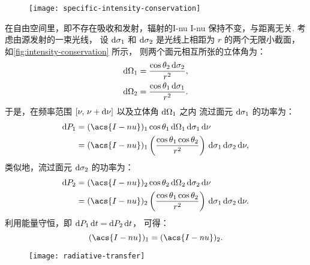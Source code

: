 \begin{figure}[htp]
  \centering
  \texttt{[image: specific-intensity-conservation]}
  \label{fig:intensity-conservation}
\end{figure}

在自由空间里，即不存在吸收和发射，辐射的\acl*{I-nu} \acs*{I-nu} 保持不变，与距离无关.
考虑由源发射的一束光线，
设 $\mathrm{d}\sigma_1$ 和 $\mathrm{d}\sigma_2$ 是光线上相距为 $r$ 的两个无限小截面，
如\autoref{fig:intensity-conservation} 所示，
则两个面元相互所张的立体角为：
\begin{align}
  \mathrm{d}\Omega_1 & = \frac{\cos\theta_2 \,\mathrm{d}\sigma_2}{r^2} , \\
  \mathrm{d}\Omega_2 & = \frac{\cos\theta_1 \,\mathrm{d}\sigma_1}{r^2} .
\end{align}
于是，在频率范围 $[\nu, \,\nu+\mathrm{d}\nu]$ 以及立体角 $\mathrm{d}\Omega_1$ 之内
流过面元 $\mathrm{d}\sigma_1$ 的功率为：
\begin{align}
  \D{P_1} & = (\acs{I-nu})_1 \cos\theta_1
      \,\D{\Omega_1} \,\D{\sigma_1} \,\D{\nu}  \\
    & = (\acs{I-nu})_1 \left( \frac{\cos\theta_1 \cos\theta_2}{r^2} \right)
      \,\D{\sigma_1} \,\D{\sigma_2} \,\D{\nu} ,
\end{align}
类似地，流过面元 $\mathrm{d}\sigma_2$ 的功率为：
\begin{align}
  \D{P_2} & = (\acs{I-nu})_2 \cos\theta_2
      \,\D{\Omega_2} \,\D{\sigma_2} \,\D{\nu}  \\
    & = (\acs{I-nu})_2 \left( \frac{\cos\theta_1 \cos\theta_2}{r^2} \right)
      \,\D{\sigma_1} \,\D{\sigma_2} \,\D{\nu} .
\end{align}
利用能量守恒，即 $\mathrm{d}P_1\,\mathrm{d}t = \mathrm{d}P_2\,\mathrm{d}t$，
可得：
\begin{equation}
  \label{eq:intensity-conservation}
  (\acs{I-nu})_1 = (\acs{I-nu})_2 .
\end{equation}

\begin{figure}[htp]
  \centering
  \texttt{[image: radiative-transfer]}
  \label{fig:radiative-transfer}
\end{figure}

